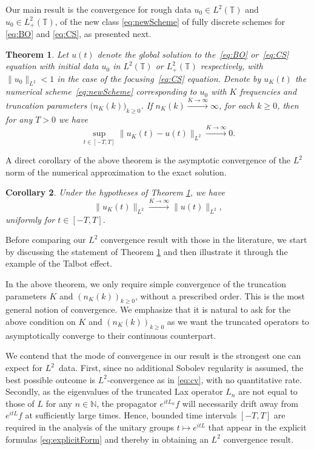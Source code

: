 \documentclass [11pt] {article}
\newtheorem{thm}{Theorem}[section]
\newtheorem{cor}[thm]{Corollary}
\newcommand{\<}{\langle}
\renewcommand{\>}{\rangle}
\begin{document}
Our main result is the convergence for rough data $u_0 \in L^2(\mathbb{T})$ and $u_0 \in L^2_{+}(\mathbb{T})$, of the new class \eqref{eq:newScheme} of fully discrete schemes for \eqref{eq:BO} and \eqref{eq:CS}, as presented next.

\begin{thm}\label{thm:main}
Let $u(t)$ denote the global solution to the~\eqref{eq:BO} or~\eqref{eq:CS} equation with initial data $u_0$ in $L^2(\mathbb{T})$ or $L^2_+(\mathbb{T})$ respectively, with $\| u_0 \|_{L^2} < 1$ in the case of the focusing~\eqref{eq:CS} equation. Denote by $u_K(t)$ the numerical scheme~\eqref{eq:newScheme} corresponding to $u_0$ with $K$ frequencies and truncation parameters $\big(n_K(k)\big)_{k\geq 0}$.  If $n_K(k) \xrightarrow{K\to\infty} \infty$, for each $k\ge 0$,
then for any $T>0$ we have
\begin{equation}\label{eq:cv}
\sup_{t\in [-T, T]}\| u_{K}(t) - u(t)\|_{L^2} \xrightarrow{{ K\to\infty}
} 0.
\end{equation}
\end{thm}

A direct corollary of the above theorem is the asymptotic convergence of the $L^2$ norm of the numerical approximation to the exact solution.
\begin{cor}
Under the hypotheses of Theorem \ref{thm:main}, we have
\[
\|u_{K}(t) \|_{L^2} \xrightarrow{ K\to\infty}
\| u(t)\|_{L^2},
\]
uniformly for $t\in [-T,T]$.
\end{cor}

Before comparing our $L^2$ convergence result with those in the literature, we start by discussing the statement of Theorem \ref{thm:main} and then illustrate it through the example of the Talbot effect.

In the above theorem, we only require simple convergence of the truncation parameters $K$ and $(n_{K}(k))_{k\geq 0}$, without a prescribed order. This is the most general notion of convergence. We emphasize that it is natural to ask for the above condition on $K$ and $(n_{K}(k))_{k\geq 0}$ as we want the truncated operators to asymptotically converge to their continuous counterpart. 

We contend that the mode of convergence in our result is the strongest one can expect for $L^2$~data. First, since no additional Sobolev regularity is assumed, the best possible outcome is $L^2$-convergence as in \eqref{eq:cv}, with no quantitative rate.
Secondly, as the eigenvalues of the truncated Lax operator $L_n$ are not equal to those of $L$ for any $n\in \mathbb{N}$, the propagator $e^{itL_n}f$ will necessarily drift away from $e^{itL}f$ at sufficiently large times. Hence, bounded time intervals $[-T,T]$ are required in the analysis of the unitary groups $t\mapsto e^{itL}$ that appear in the explicit formulas \eqref{eq:explicitForm} and thereby in obtaining an $L^2$ convergence result.
\end{document}
